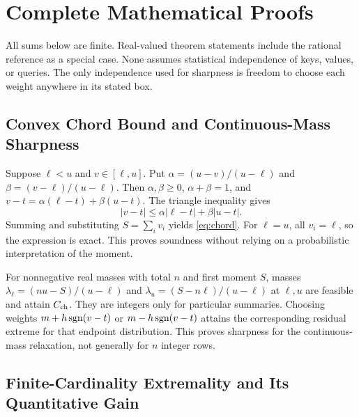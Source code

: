 \section{Complete Mathematical Proofs}

All sums below are finite. Real-valued theorem statements include the rational
reference as a special case. None assumes statistical independence of keys,
values, or queries. The only independence used for sharpness is freedom to
choose each weight anywhere in its stated box.

\subsection{Convex Chord Bound and Continuous-Mass Sharpness}
\label{app:chord}

Suppose $\ell<u$ and $v\in[\ell,u]$. Put
$\alpha=(u-v)/(u-\ell)$ and $\beta=(v-\ell)/(u-\ell)$.
Then $\alpha,\beta\ge0$, $\alpha+\beta=1$, and
$v-t=\alpha(\ell-t)+\beta(u-t)$. The triangle inequality gives
\begin{equation}
 |v-t|\le\alpha|\ell-t|+\beta|u-t|.
\end{equation}
Summing and substituting $S=\sum_i v_i$ yields \cref{eq:chord}.
For $\ell=u$, all $v_i=\ell$, so the expression is exact. This proves
soundness without relying on a probabilistic interpretation of the moment.

For nonnegative real masses with total $n$ and first moment $S$, masses
$\lambda_\ell=(nu-S)/(u-\ell)$ and
$\lambda_u=(S-n\ell)/(u-\ell)$ at $\ell,u$ are feasible and attain
$C_{\rm ch}$. They are integers only for particular summaries. Choosing
weights $m+h\operatorname{sgn}(v-t)$ or $m-h\operatorname{sgn}(v-t)$ attains the corresponding
residual extreme for that endpoint distribution. This proves sharpness for
the continuous-mass relaxation, not generally for $n$ integer rows.

\subsection{Finite-Cardinality Extremality and Its Quantitative Gain}
\label{app:integer}

